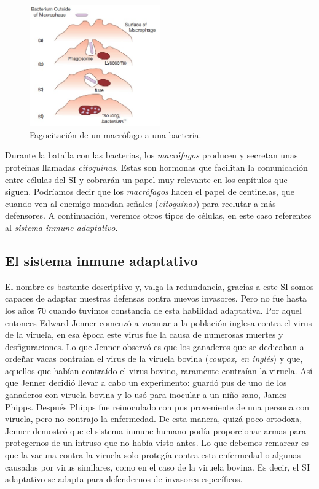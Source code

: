 \begin{figure}[t]
	\centering
	\includegraphics[width=0.5\textwidth]{1_macrofago}
	\caption{Fagocitación de un macrófago a una bacteria.}
	\label{fig:macrofago}
\end{figure}


Durante la batalla con las bacterias, los \textit{macrófagos} producen y secretan unas proteínas llamadas \textit{citoquinas}.
Estas son hormonas que facilitan la comunicación entre células del SI y cobrarán un papel muy relevante en los capítulos que siguen.
Podríamos decir que los \textit{macrófagos} hacen el papel de centinelas, que cuando ven al enemigo mandan señales (\textit{citoquinas}) para reclutar a más defensores. A continuación, veremos otros tipos de células, en este caso referentes al \textit{sistema inmune adaptativo}.

\subsection{El sistema inmune adaptativo}

El nombre es bastante descriptivo y, valga la redundancia, gracias a este SI somos capaces de adaptar nuestras defensas contra nuevos invasores. Pero no fue hasta los años 70 cuando tuvimos constancia de esta habilidad adaptativa. Por aquel entonces Edward Jenner comenzó a vacunar a la población inglesa contra el virus de la viruela, en esa época este virus fue la causa de numerosas muertes y desfiguraciones. Lo que Jenner observó es que los ganaderos que se dedicaban a ordeñar vacas contraían el virus de la viruela bovina (\textit{cowpox, en inglés}) y que, aquellos  que habían contraído el virus bovino, raramente contraían la viruela. Así que Jenner decidió llevar a cabo un experimento: guardó pus de uno de los ganaderos con viruela bovina y lo usó para inocular a un niño sano, James Phipps. Después Phipps fue reinoculado con pus proveniente de una persona con viruela, pero no contrajo la enfermedad. De esta manera, quizá poco ortodoxa, Jenner demostró que el sistema inmune humano podía proporcionar armas para protegernos de un intruso que no había visto antes. Lo que debemos remarcar es que la vacuna contra la viruela solo protegía contra esta enfermedad o algunas causadas por virus similares, como en el caso de la viruela bovina. Es decir, el SI adaptativo se adapta para defendernos de invasores específicos. 

